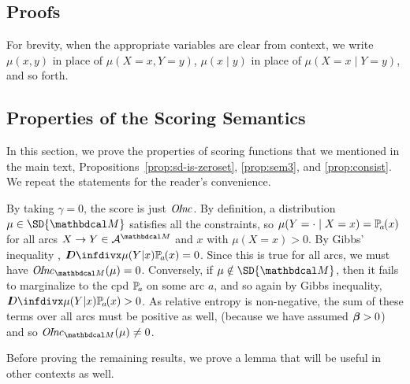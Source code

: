 \begin{subappendices}

\section{Proofs} \label{sec:proofs}
For brevity, when the appropriate variables are clear from context,
we write $\mu(x, y)$
in place of $\mu(X \!=\! x, Y \!=\! y)$, $\mu(x \mid y)$ in place of
$\mu(X \!=\! x\mid Y \!=\! y)$, and so forth.

	
\subsection{Properties of the Scoring Semantics}

In this section, we prove the properties of scoring functions that we
mentioned in the main text,
Propositions~\ref{prop:sd-is-zeroset}, \ref{prop:sem3}, and
\ref{prop:consist}.  We repeat the statements for the reader's convenience.

\begin{lproof}\label{proof:sd-is-zeroset}
	 By taking $\gamma = 0$, the score is just $\mathit{O\mskip-2.5muI\mskip-3.5mun\mskip-1.7muc}$. By
			 definition, a distribution $\mu \in \SD{\dg M}$ satisfies
	  all the
			 constraints, so $\mu(Y = \cdot \mid X=x) =
			 \p_a(x)$ for all arcs $X \rightarrow Y \in \Ar^{\dg
			   M}$ and $x$ with 
			 $\mu(X=x)>0$. By Gibbs' inequality
			 \citep{mackay2003information}, 
			 $\kldiv{\mu(Y|x)}{\p_a(x)} = 0$. Since this is true
			 for all arcs, we must have $\OInc_{\dg M}( \mu) =
			 0$. Conversely, if $\mu \notin \SD{\dg M}$, then it
			 fails to marginalize to the cpd $\p_a$ on some arc
							  $a$, and so again by Gibbs inequality,
			 $\kldiv{\mu(Y|x)}{\p_a(x)} > 0$. As relative entropy
			 is non-negative, the sum of these terms over all
			 arcs must be positive as well, (because we have assumed $\boldsymbol\beta > 0$) and so $\OInc_{\dg M}(
			 \mu) \neq 0$. %
\end{lproof}


Before proving the remaining results, we prove a lemma that will be useful
in other contexts as well. 

\end{subappendices}
